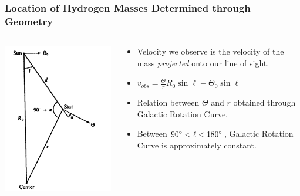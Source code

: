 \documentclass{beamer}
\begin{document}
\begin{frame}
  \frametitle{Location of Hydrogen Masses Determined through Geometry}
  \begin{columns}
    \begin{column}{0.4\textwidth}
  \includegraphics[width=1\textwidth]{geom}
\end{column}
\begin{column}{0.6\textwidth}
  \begin{itemize}
    \item Velocity we observe is the velocity of the mass \textit{projected} onto our line of sight. 
    \item $v_{obs} = \frac{\Theta}{r} R_0 \sin \ell - \Theta_0 \sin \ell$
    \item Relation between $\Theta$ and $r$ obtained through Galactic Rotation Curve.
    \item Between $90\degree < \ell < 180\degree$, Galactic Rotation Curve is approximately constant.
  \end{itemize} 
\end{column}
\end{columns}
\end{frame}
\end{document}

